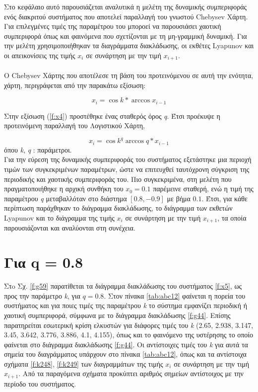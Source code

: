 Στο κεφάλαιο αυτό παρουσιάζεται αναλυτικά η μελέτη της δυναμικής συμπεριφοράς ενός διακριτού συστήματος που αποτελεί παραλλαγή του γνωστού Chebysev Χάρτη. Για επιλεγμένες τιμές της παραμέτρου του μποροεί να παρουσιάσει χαοτική συμπεριφορά όπως και φαινόμενα που σχετίζονται με τη μη-γραμμική δυναμική. Για την μελέτη χρησιμοποιήθηκαν τα διαγράμματα διακλάδωσης, οι εκθέτες Lyapunov και οι απεικονίσεις της τιμής \(x_i\) σε συνάρτηση με  την τιμή \(x_{i+1}\).\\\\

Ο Chebysev Χάρτης που αποτέλεσε τη βάση του προτεινόμενου σε αυτή την ενότητα, χάρτη, περιγράφεται από την παρακάτω εξίσωση:

\begin{equation}
	x_i=\cos{k*\arccos{x_{i-1}}}
	\label{f:x4}
\end{equation}


Στην εξίσωση (\ref{f:x4}) προστέθηκε ένας σταθερός όρος \emph{q}. Έτσι προέκυψε η προτεινόμενη παραλλαγή του Λογιστικού Χάρτη,

\begin{equation}
	x_i=\cos{k^q\arccos{q*x_{i-1}}}
	\label{f:x5}
\end{equation}
όπου \emph{k}, \emph{q} : παράμετροι.\\

Για την εύρεση της δυναμικής συμπεριφοράς του συστήματος εξετάστηκε μια περιοχή τιμών των συγκεκριμένων παραμέτρων, ώστε να επιτευχθεί ταυτόχρονη σύγκριση της περιοδικής και χαοτικής συμπεριφοράς του. Πιο συγκεκριμένα, στη μελέτη που πραγματοποιήθηκε η αρχική συνθήκη του $x_0 =0.1$ παρέμεινε  σταθερή, ενώ η τιμή της παραμέτρου \emph{q} μεταβαλλόταν στο διάστημα $[0.8,-0.9]$ με βήμα $0.1$. Έτσι, για κάθε περίπτωση παράχθηκαν το διάγραμμα διακλάδωσης, το διάγραμμα των εκθετών Lyapunov και το διάγραμμα της τιμής \(x_i\) σε συνάρτηση με  την τιμή \(x_{i+1}\), τα οποία παρουσιάζονται και αναλύονται στη συνέχεια.\\




\section{Για q = 0.8}

Στo Σχ. \ref{f:g59} παρατίθεται τα διάγραμμα διακλάδωσης του συστήματος \ref{f:x5}, ως προς την παράμετρο \emph{k}, για $q =0.8$. Στον πίνακα \ref{tab:abc12} φαίνεται η πορεία του συστήματος και για ποιες τιμές της παραμέτρου \emph{k} το σύστημα εμφανίζει περιοδική ή χαοτική συμπεριφορά, σύμφωνα με το διάγραμμα διακλάδωσης \ref{f:g44}. Επίσης παρατηρείται εσωτερική κρίση ελκυστών για διάφορες τιμές του \emph{k} (2.65, 2.938, 3.147, 3.45, 3.642, 3.776, 3.886, 4.1, 4.155), όπως και το φαινόμενο της υστέρησης το οποίο φαίνεται στο διάγραμμα διακλάδωσης \ref{f:g44}. Οι αντίστοιχες τιμές του \emph{k} για αυτά τα σημεία του διαγράμματος υπάρχουν στο πίνακα \ref{tab:abc12}, όπως και τα αντίστοιχα σχήματα \ref{f:k248}, \ref{f:k249} των διαγραμμάτων της τιμής \(x_i\) σε συνάρτηση με την τιμή \(x_{i+1}\). Από τα παραγόμενα σχήματα προκύπτει αριθμός σημείων αντίστοιχος με την περίοδο του συστήματος.

